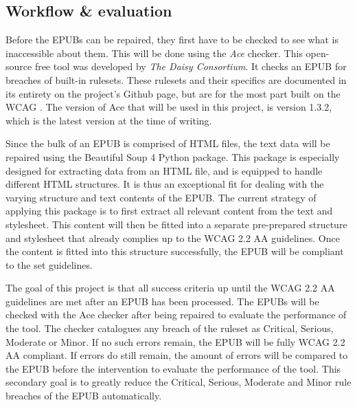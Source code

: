 \subsection{Workflow \& evaluation}
Before the EPUBs can be repaired, they first have to be checked to see what is inaccessible about them. This will be done using the \textit{Ace} checker. This open-source free tool was developed by \textit{The Daisy Consortium}. It checks an EPUB for breaches of built-in rulesets. These rulesets and their specifics are documented in its entirety on the project's Github page, but are for the most part built on the WCAG \cite{AceRules}. The version of Ace that will be used in this project, is version 1.3.2, which is the latest version at the time of writing.

Since the bulk of an EPUB is comprised of HTML files, the text data will be repaired using the Beautiful Soup 4 Python package. This package is especially designed for extracting data from an HTML file, and is equipped to handle different HTML structures. It is thus an exceptional fit for dealing with the varying structure and text contents of the EPUB. The current strategy of applying this package is to first extract all relevant content from the text and stylesheet. This content will then be fitted into a separate pre-prepared structure and stylesheet that already complies up to the WCAG 2.2 AA guidelines. Once the content is fitted into this structure successfully, the EPUB will be compliant to the set guidelines. 

The goal of this project is that all success criteria up until the WCAG 2.2 AA guidelines are met after an EPUB has been processed. The EPUBs will be checked with the Ace checker after being repaired to evaluate the performance of the tool. The checker catalogues any breach of the ruleset as Critical, Serious, Moderate or Minor. If no such errors remain, the EPUB will be fully WCAG 2.2 AA compliant. If errors do still remain, the amount of errors will be compared to the EPUB before the intervention to evaluate the performance of the tool. This secondary goal is to greatly reduce the Critical, Serious, Moderate and Minor rule breaches of the EPUB automatically.